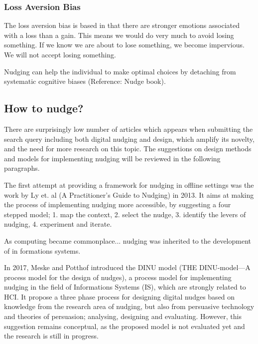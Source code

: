 \subsubsection{Loss Aversion Bias}
The loss aversion bias is based in that there are stronger emotions associated with a loss than a gain. This means we would do very much to avoid losing something. If we know we are about to lose something, we become impervious. We will not accept losing something.

Nudging can help the individual to make optimal choices by detaching from systematic cognitive biases (Reference: Nudge book). 

\subsection{How to nudge?}
There are surprisingly low number of articles which appears when submitting the search query including both digital nudging and design, which amplify its novelty, and the need for more research on this topic. The suggestions on design methods and models for implementing nudging will be reviewed in the following paragraphs. 

The first attempt at providing a framework for nudging in offline settings was the work by Ly et. al (A Practitioner’s Guide to Nudging) in 2013. It aims at making the process of implementing nudging more accessible, by suggesting a four stepped model; 1. map the context, 2. select the nudge, 3. identify the levers of nudging, 4. experiment and iterate. %

As computing became commonplace... nudging was inherited to the development of in formations systems. 

In 2017, Meske and Potthof introduced the DINU model (THE DINU-model—A process model for the design of nudges), a process model for implementing nudging in the field of Informations Systems (IS), which are strongly related to HCI. It propose a three phase process for designing digital nudges based on knowledge from the research area of nudging, but also from persuasive technology and theories of persuasion; analysing, designing and evaluating. However, this suggestion remains conceptual, as the proposed model is not evaluated yet and the research is still in progress.

